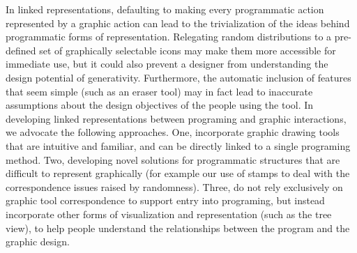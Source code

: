 \documentclass{sigchi}
\begin{document}
In linked representations, defaulting to making every programmatic action represented by a graphic action can lead to the trivialization of the ideas behind programmatic forms of representation. Relegating random distributions to a pre-defined set of graphically selectable icons may make them more accessible for immediate use, but it could also prevent a designer from understanding the design potential of generativity. Furthermore, the automatic inclusion of features that seem simple (such as an eraser tool) may in fact lead to inaccurate assumptions about the design objectives of the people using the tool. In developing linked representations between programing and graphic interactions, we advocate the following approaches. One, incorporate graphic drawing tools that are intuitive and familiar, and can be directly linked to a single programing method. Two, developing novel solutions for programmatic structures that are difficult to represent graphically (for example our use of stamps to deal with the correspondence issues raised by randomness). Three, do not rely exclusively on graphic tool correspondence to support entry into programing, but instead incorporate other forms of visualization and representation (such as the tree view), to help people understand the relationships between the program and the graphic design.
\end{document}
